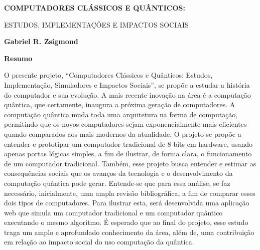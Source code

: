 \thispagestyle{plain}
\begin{center}
    \Large
    \textbf{COMPUTADORES CLÁSSICOS E QUÂNTICOS:}
    
    \vspace{0.2cm}
    \large
    ESTUDOS, IMPLEMENTAÇÕES E IMPACTOS SOCIAIS
    
    \vspace{0.2cm}
    \textbf{Gabriel R. Zsigmond}
    
    \vspace{0.4cm}
    \textbf{Resumo}
\end{center}
O presente projeto, ``Computadores Clássicos e Quânticos: Estudos, Implementação, Simuladores e Impactos Sociais'', se propõe a estudar a história do computador e sua evolução. A mais recente inovação na área é a computação quântica, que certamente, inaugura a próxima geração de computadores. A computação quântica muda toda uma arquitetura na forma de computação, permitindo que os novos computadores sejam exponencialmente mais eficientes quando comparados aos mais modernos da atualidade. O projeto se propõe a entender e prototipar um computador tradicional de 8 bits em hardware, usando apenas portas lógicas simples, a fim de ilustrar, de forma clara, o funcionamento de um computador tradicional. Também, esse projeto busca entender e estimar as consequências sociais que os avanços da tecnologia e o desenvolvimento da computação quântica pode gerar. Entende-se que para essa análise, se faz necessário, inicialmente, uma ampla revisão bibliográfica, a fim de comparar esses dois tipos de computadores. Para ilustrar esta, será desenvolvida uma aplicação web que simula um computador tradicional e um computador quântico executando o mesmo algoritmo. É esperado que ao final do projeto, esse estudo traga um amplo e aprofundado conhecimento da área, além de, uma contribuição em relação ao impacto social do uso computação da quântica.